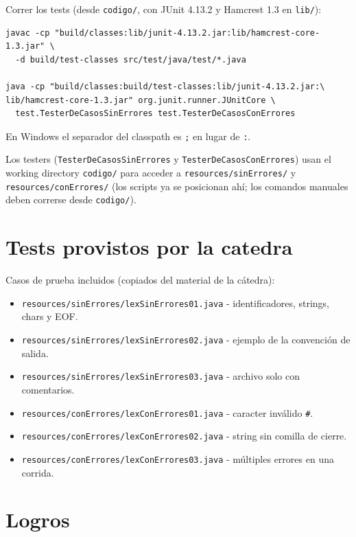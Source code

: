 \documentclass[11pt,a4paper]{article}
\begin{document}
Correr los tests (desde \texttt{codigo/}, con JUnit 4.13.2 y Hamcrest 1.3 en \texttt{lib/}):

{\footnotesize
\begin{verbatim}
javac -cp "build/classes:lib/junit-4.13.2.jar:lib/hamcrest-core-1.3.jar" \
  -d build/test-classes src/test/java/test/*.java

java -cp "build/classes:build/test-classes:lib/junit-4.13.2.jar:\
lib/hamcrest-core-1.3.jar" org.junit.runner.JUnitCore \
  test.TesterDeCasosSinErrores test.TesterDeCasosConErrores
\end{verbatim}
}

En Windows el separador del classpath es \texttt{;} en lugar de \texttt{:}.

Los testers (\texttt{TesterDeCasosSinErrores} y \texttt{TesterDeCasosConErrores}) usan el working
directory \texttt{codigo/} para acceder a \texttt{resources/sinErrores/} y
\texttt{resources/conErrores/} (los scripts ya se posicionan ahí; los comandos manuales
deben correrse desde \texttt{codigo/}).

\section{Tests provistos por la catedra}

Casos de prueba incluidos (copiados del material de la cátedra):

\begin{itemize}
  \item \texttt{resources/sinErrores/lexSinErrores01.java} - identificadores, strings, chars y EOF.
  \item \texttt{resources/sinErrores/lexSinErrores02.java} - ejemplo de la convención de salida.
  \item \texttt{resources/sinErrores/lexSinErrores03.java} - archivo solo con comentarios.
  \item \texttt{resources/conErrores/lexConErrores01.java} - caracter inválido \texttt{\#}.
  \item \texttt{resources/conErrores/lexConErrores02.java} - string sin comilla de cierre.
  \item \texttt{resources/conErrores/lexConErrores03.java} - múltiples errores en una corrida.
\end{itemize}

\section{Logros}
\end{document}
